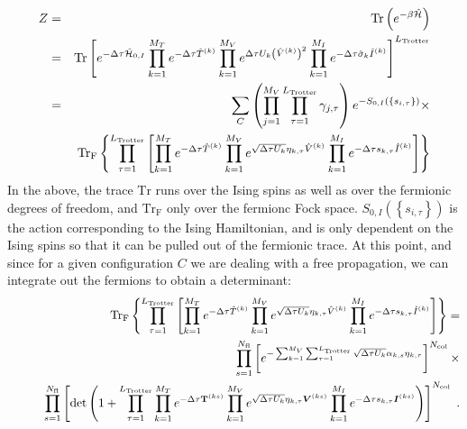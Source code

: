 \begin{eqnarray}
Z &=& \mathop{\mathrm{Tr}}{\left(e^{-\beta \hat{\mathcal{H}} }\right)}\nonumber\\
  &=&   \mathop{\mathrm{Tr}}{  \left[ e^{-\Delta \tau \hat{\mathcal{H}}_{0,I}}   \prod_{k=1}^{M_T}   e^{-\Delta \tau \hat{T}^{(k)}}  
    \prod_{k=1}^{M_V}   e^{  \Delta \tau  U_k \left(  \hat{V}^{(k)} \right)^2}   \prod_{k=1}^{M_I}   e^{  -\Delta \tau  \hat{\sigma}_{k}  \hat{I}^{(k)}} 
   \right]^{L_{\text{Trotter}}}}  \nonumber \\
   &=&
   \sum_{C} \left( \prod_{j=1}^{M_V} \prod_{\tau=1}^{L_{\mathrm{Trotter}}} \gamma_{j,\tau} \right) e^{-S_{0,I} \left( \left\{ s_{i,\tau} \right\}  \right) }\times \nonumber\\
   &\quad&
    \mathop{\mathrm{Tr}_{\mathrm{F}}}{ \left\{  \prod_{\tau=1}^{L_{\mathrm{Trotter}}} \left[   \prod_{k=1}^{M_T}   e^{-\Delta \tau \hat{T}^{(k)}}  
    \prod_{k=1}^{M_V}   e^{  \sqrt{ \Delta \tau  U_k} \eta_{k,\tau} \hat{V}^{(k)} }   \prod_{k=1}^{M_I}   e^{  -\Delta \tau s_{k,\tau}  \hat{I}^{(k)}}  \right]\right\} }
\end{eqnarray}
In the above,  the trace $\mathrm{Tr} $  runs over the Ising spins as well as over the fermionic degrees of freedom, and $ \mathrm{Tr}_{\mathrm{F}}  $ only over the  fermionc Fock space. 
$S_{0,I} \left( \left\{ s_{i,\tau} \right\}  \right)  $ is the action  corresponding to the Ising Hamiltonian,  and is only dependent on the Ising spins so that  it can be pulled out of the fermionic trace.
At this point,  and  since for a given configuration $C$  we are dealing with a free propagation, we can integrate out the fermions to obtain a determinant: 
\begin{eqnarray}
 &\quad&\mathop{\mathrm{Tr}_{\mathrm{F}}}{ \left\{  \prod_{\tau=1}^{L_{\mathrm{Trotter}}} \left[   \prod_{k=1}^{M_T}   e^{-\Delta \tau \hat{T}^{(k)}}  
    \prod_{k=1}^{M_V}   e^{  \sqrt{ \Delta \tau  U_k} \eta_{k,\tau} \hat{V}^{(k)} }   \prod_{k=1}^{M_I}   e^{  -\Delta \tau s_{k,\tau}  \hat{I}^{(k)}}  \right] \right\}} = \nonumber\\
&\quad& \quad\prod\limits_{s=1}^{N_{\mathrm{fl}}} \left[  e^{- \sum_{k=1}^{M_V} \sum_{\tau = 1}^{L_{\mathrm{Trotter}}}\sqrt{\Delta \tau U_k}  \alpha_{k,s} \eta_{k,\tau} }
   \right]^{N_{\mathrm{col}}}\times
\nonumber\\
&\quad&\quad   \prod\limits_{s=1}^{N_{\mathrm{fl}}} 
   \left[
    \det\left(  1 + 
     \prod_{\tau=1}^{L_{\mathrm{Trotter}}}   \prod_{k=1}^{M_T}   e^{-\Delta \tau {\bf T}^{(ks)}}  
    \prod_{k=1}^{M_V}   e^{  \sqrt{ \Delta \tau  U_k} \eta_{k,\tau} {\bm V}^{(ks)} }   \prod_{k=1}^{M_I}   e^{  -\Delta \tau s_{k,\tau}  {\bm I}^{(ks)}}  
     \right) \right]^{N_{\mathrm{col}}}\;.
\end{eqnarray}
